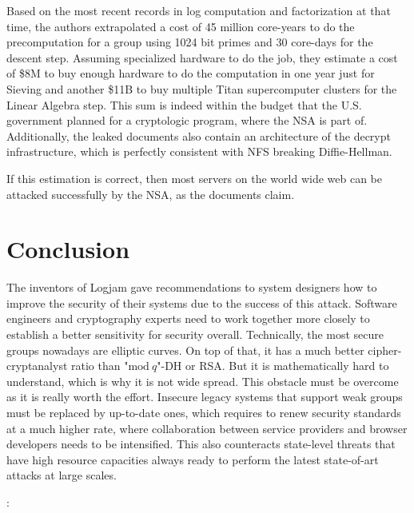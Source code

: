 \documentclass[paper=a4, fontsize=11pt]{scrartcl} %
\numberwithin{equation}{section} %
\numberwithin{figure}{section} %
\numberwithin{table}{section} %
\begin{document}
Based on the most recent records in log computation and factorization at that time, the authors extrapolated a cost of 45 million core-years to do the precomputation for a group using 1024 bit primes and 30 core-days for the descent step. Assuming specialized hardware to do the job, they estimate a cost of \$8M to buy enough hardware to do the computation in one year just for Sieving and another \$11B to buy multiple Titan supercomputer clusters for the Linear Algebra step. This sum is indeed within the budget that the U.S. government planned for a cryptologic program, where the NSA is part of. Additionally, the leaked documents also contain an architecture of the decrypt infrastructure, which is perfectly consistent with NFS breaking Diffie-Hellman.

If this estimation is correct, then most servers on the world wide web can be attacked successfully by the NSA, as the documents claim.

\section{Conclusion}
The inventors of Logjam gave recommendations to system designers how to improve the security of their systems due to the success of this attack. Software engineers and cryptography experts need to work together more closely to establish a better sensitivity for security overall. Technically, the most secure groups nowadays are elliptic curves. On top of that, it has a much better cipher-cryptanalyst ratio than "$\mathrm{mod}\ q$"-DH or RSA. But it is mathematically hard to understand, which is why it is not wide spread. This obstacle must be overcome as it is really worth the effort. Insecure legacy systems that support weak groups must be replaced by up-to-date ones, which requires to renew security standards at a much higher rate, where collaboration between service providers and browser developers needs to be intensified. This also counteracts state-level threats that have high resource capacities always ready to perform the latest state-of-art attacks at large scales.


\newpage



\newpage
{}%
\clearpage
\thispagestyle{empty}
\noindent \textbf{\underline{}}:\\
\end{document}
